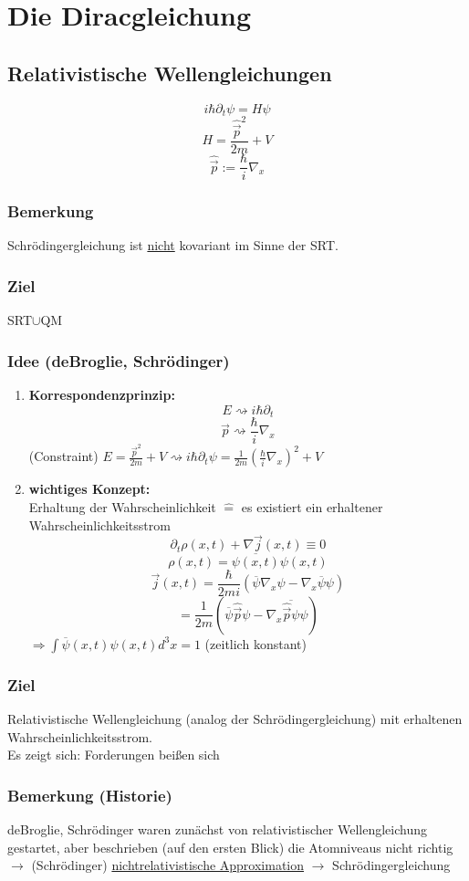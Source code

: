 \documentclass[twoside,a4paper]{scrartcl}
\renewcommand{\1}{\mathds{1}}
\newcommand{\Ra}{\Rightarrow}
\newcommand{\ra}{\rightarrow}
\newcommand{\entspricht}{\mathrel{\widehat{=}}}
\begin{document}
\section{Die Diracgleichung}
\subsection{Relativistische Wellengleichungen}
$$i\hbar \partial_t \psi=H\psi$$
$$H=\frac{\hat{\vec p}^2}{2m}+V$$
$$\hat{\vec p}:=\frac{\hbar}{i}\nabla_x$$
\subsubsection*{Bemerkung}
Schrödingergleichung ist \underline{nicht} kovariant im Sinne der SRT.
\subsubsection*{Ziel}
SRT$\cup$QM
\subsubsection*{Idee (deBroglie, Schrödinger)}
\begin{enumerate}
\item \textbf{Korrespondenzprinzip:}
$$E \rightsquigarrow i\hbar \partial_t$$
$$\vec p \rightsquigarrow \frac{\hbar}{i} \nabla_x$$
(Constraint) $E=\frac{\vec p^2}{2m}+V \rightsquigarrow  i\hbar \partial_t \psi=\frac{1}{2m}(\frac{\hbar}{i}\nabla_x)^2+V$
\item \textbf{wichtiges Konzept:}\\
Erhaltung der Wahrscheinlichkeit $\entspricht$ es existiert ein erhaltener Wahrscheinlichkeitsstrom
$$\partial_t \rho(x,t)+\nabla \vec j(x,t)\equiv0$$
$$\rho(x,t)=\overline{\psi(x,t)} \psi(x,t)$$
$$\vec j(x,t)=\frac{\hbar}{2mi}(\overline{\psi}\nabla_x \psi-\nabla_x \overline{\psi}\psi)$$
$$=\frac{1}{2m}(\overline{\psi} \hat{\vec p} \psi-\nabla_x \overline{\hat{\vec p}\psi}\psi)$$
$\Ra \int \overline{\psi}(x,t) \psi(x,t)d^3x=1$ (zeitlich konstant) 
\end{enumerate}
\subsubsection*{Ziel}
Relativistische Wellengleichung (analog der Schrödingergleichung) mit erhaltenen Wahrscheinlichkeitsstrom.\\
Es zeigt sich: Forderungen beißen sich
\subsubsection*{Bemerkung (Historie)}
deBroglie, Schrödinger waren zunächst von relativistischer Wellengleichung gestartet, aber beschrieben (auf den ersten Blick) die Atomniveaus nicht richtig\\
$\ra$ (Schrödinger) \underline{nichtrelativistische Approximation} $\ra$ Schrödingergleichung
\end{document}
